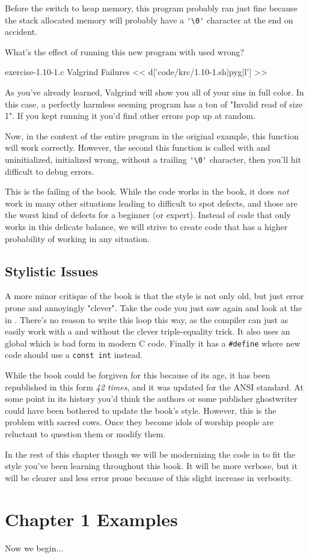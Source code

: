 Before the switch to heap memory, this program probably ran just fine
because the stack allocated memory will probably have a \verb|'\0'| character
at the end on accident.

What's the effect of running this new program with  used wrong?

\begin{code}{exercise-1.10-1.c Valgrind Failures}
<< d['code/krc/1.10-1.sh|pyg|l'] >>
\end{code}

As you've already learned, Valgrind will show you all of your sins in full
color.  In this case, a perfectly harmless seeming program has a ton of
"Invalid read of size 1".  If you kept running it you'd find other errors pop
up at random.

Now, in the context of the entire program in the original \krc example, this function
will work correctly.  However, the second this function is called with
 and  uninitialized, initialized wrong, 
without a trailing \verb|'\0'| character, then you'll hit difficult to debug
errors.

This is the failing of the book.  While the code works in the book, it does
\emph{not} work in many other situations leading to difficult to spot defects,
and those are the worst kind of defects for a beginner (or expert).
Instead of code that only works in this delicate balance, we will strive to
create code that has a higher probability of working in any situation.


\subsection{Stylistic Issues}

A more minor critique of the book is that the style is not only old, but just
error prone and annoyingly "clever".  Take the code you just saw again and look
at the  in .  There's no reason to write this
loop this way, as the compiler can just as easily work with a 
and without the clever triple-equality trick.  It also uses an 
global which is bad form in modern C code.  Finally it has a \verb|#define|
where new code should use a \verb|const int| instead.

While the book could be forgiven for this because of its age, it has been
republished in this form \emph{42 times}, and it was updated for the ANSI
standard.  At some point in its history you'd think the authors or some
publisher ghostwriter could have been bothered to update the book's style.
However, this is the problem with sacred cows.  Once they become idols of
worship people are reluctant to question them or modify them.

In the rest of this chapter though we will be modernizing the code in \krc
to fit the style you've been learning throughout this book.  It will be
more verbose, but it will be clearer and less error prone because of
this slight increase in verbosity.


\section{Chapter 1 Examples}

Now we begin...
